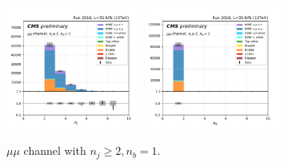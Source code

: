 \begin{figure}[ht]
    \includegraphics[width=0.4\textwidth]{chapters/Analysis/sectionPlots/figures/kinematics_pickles/mumu/1b/mumu_1b_nJets.pdf}
    \includegraphics[width=0.4\textwidth]{chapters/Analysis/sectionPlots/figures/kinematics_pickles/mumu/1b/mumu_1b_nBJets.pdf}
    
    \caption{$\mu \mu$ channel with $n_j\geq2, n_b=1$.}
\end{figure}

